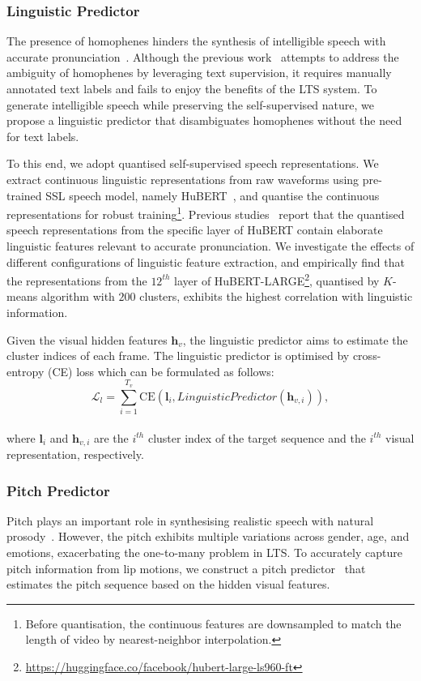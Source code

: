 \documentclass[letterpaper]{article} %
\begin{document}
\subsubsection{Linguistic Predictor}
The presence of homophenes hinders the synthesis of intelligible speech with accurate pronunciation~\cite{ephrat2017vid2speech}.
Although the previous work~\cite{kim2023lip} attempts to address the ambiguity of homophenes by leveraging text supervision, it requires manually annotated text labels and fails to enjoy the benefits of the LTS system.
To generate intelligible speech while preserving the self-supervised nature, we propose a linguistic predictor that disambiguates homophenes without the need for text labels.

To this end, we adopt quantised self-supervised speech representations.
We extract continuous linguistic representations from raw waveforms using pre-trained SSL speech model, namely HuBERT~\cite{hsu2021hubert}, and quantise the continuous representations for robust training\footnote{Before quantisation, the continuous features are downsampled to match the length of video by nearest-neighbor interpolation.}.
Previous studies~\cite{polyak2021speech, lakhotia2021generative, kreuk2021textless} report that the quantised speech representations from the specific layer of HuBERT contain elaborate linguistic features relevant to accurate pronunciation.
We investigate the effects of different configurations of linguistic feature extraction, and empirically find that the representations from the $12^{th}$ layer of HuBERT-LARGE\footnote{\url{https://huggingface.co/facebook/hubert-large-ls960-ft}}, quantised by $K$-means algorithm with $200$ clusters, exhibits the highest correlation with linguistic information.

Given the visual hidden features $\boldsymbol{h}_v$, the linguistic predictor aims to estimate the cluster indices of each frame.
The linguistic predictor is optimised by cross-entropy (CE) loss which can be formulated as follows:
\begin{equation}
    \mathcal{L}_{l}=\sum_{i=1}^{T_v}\text{CE}(\boldsymbol{l}_{i}, LinguisticPredictor(\boldsymbol{h}_{v,i})),
\end{equation}\\
where $\boldsymbol{l}_{i}$ and $\boldsymbol{h}_{v,i}$ are the $i^{th}$ cluster index of the target sequence and the $i^{th}$ visual representation, respectively.

\subsubsection{Pitch Predictor}
Pitch plays an important role in synthesising realistic speech with natural prosody~\cite{yasuda2019investigation,lancucki2021fastpitch}. However, the pitch exhibits multiple variations across gender, age, and emotions, exacerbating the one-to-many problem in LTS.
To accurately capture pitch information from lip motions, we construct a pitch predictor~\cite{lancucki2021fastpitch} that estimates the pitch sequence based on the hidden visual features.
\end{document}

